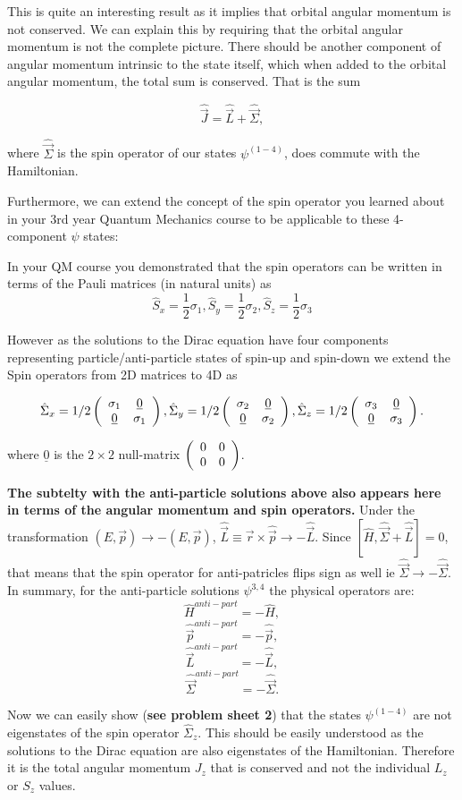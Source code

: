 This is quite an interesting result as it implies that orbital angular momentum is not conserved. We can explain this by requiring that the orbital angular momentum is not the complete picture. There should be another component of angular momentum intrinsic to the state itself, which when added to the orbital angular momentum, the total sum is conserved. That is the sum

\[\hat{\vec{J}}=\hat{\vec{L}}+\hat{\vec{\Sigma}},\]

where $\hat{\vec{\Sigma}}$ is the spin operator of our states $\psi^{(1-4)}$, does commute with the Hamiltonian. 

Furthermore, we can extend the concept of the spin operator you learned about in your 3rd year Quantum Mechanics course to be applicable to these 4-component $\psi$ states:

In your QM course you demonstrated that the spin operators can be written in terms of the Pauli matrices (in natural units) as 
\[
\hat{S}_x=\frac{1}{2}\sigma_1,\hat{S}_y=\frac{1}{2}\sigma_2,\hat{S}_z=\frac{1}{2}\sigma_3
\]

However as the solutions to the Dirac equation have four components representing particle/anti-particle states of spin-up and spin-down we extend the Spin operators from 2D matrices to 4D as


\[ \hat{\Sigma}_{x} =1/2
 \left( \begin{array}{cc} \sigma_{1} & \underline{0} \\ \underline{0} & \sigma_{1} \end{array} \right) ,
\hat{\Sigma}_{y} =1/2
 \left( \begin{array}{cc} \sigma_{2} & \underline{0} \\ \underline{0} & \sigma_{2} \end{array} \right) ,
\hat{\Sigma}_{z} =1/2
 \left( \begin{array}{cc} \sigma_{3} & \underline{0} \\ \underline{0} & \sigma_{3} \end{array} \right).
\]

where $\underline{0}$ is the $2\times2$ null-matrix 
$ \left( \begin{array}{cc} 0 & 0 \\ 0 & 0 \end{array} \right)$.


{\bf The subtelty with the anti-particle solutions above also appears here in terms of the
angular momentum and spin operators.} Under the transformation $(E,\vec{p})\to-(E,\vec{p})$, 
$\hat{\vec{L}}\equiv \vec{r}\times\hat{\vec{p}}\to -\hat{\vec{L}}$. Since $[\hat{H},\hat{\vec{\Sigma}}+\hat{\vec{L}}]=0$, that means that the spin operator for anti-patricles flips sign as well ie $\hat{\vec{\Sigma}}\to -\hat{\vec{\Sigma}}$. In summary, for the anti-particle solutions $\psi^{3,4}$ the physical operators are:
\[
   \hat{H}^{anti-part} = -\hat{H},
\]
\[
   \hat{\vec{p}}^{anti-part} = -\hat{\vec{p}},
\]
\[
   \hat{\vec{L}}^{anti-part} = -\hat{\vec{L}},
\]
\[
   \hat{\vec{\Sigma}}^{anti-part} = -\hat{\vec{\Sigma}}.
\]

Now we can easily show ({\bf see problem sheet 2}) that the states $\psi^{(1-4)}$ are not eigenstates of the spin operator $\hat{\Sigma}_{z}$. This should be easily understood as the solutions to the Dirac equation are also eigenstates of the Hamiltonian. Therefore it is the total angular momentum $J_z$ that is conserved and not the individual $L_z$ or $S_z$ values.

